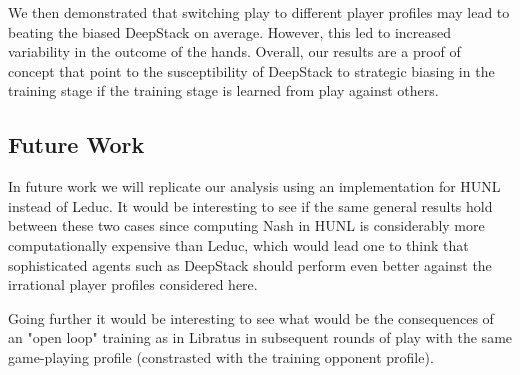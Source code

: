 \documentclass{article}
\begin{document}
\indent We then demonstrated that switching play to different player profiles may lead to beating the biased DeepStack on average. However, this led to increased variability in the outcome of the hands. Overall, our results are a proof of concept that point to the susceptibility of DeepStack to strategic biasing in the training stage if the training stage is learned from play against others. 

\subsection{Future Work}
In future work we will replicate our analysis using an implementation for HUNL instead of Leduc. It would be interesting to see if the same general results hold between these two cases since computing Nash in HUNL is considerably more computationally expensive than Leduc, which would lead one to think that sophisticated agents such as DeepStack should perform even better against the irrational player profiles considered here. 

\indent Going further it would be interesting to see what would be the consequences of an "open loop" training as in Libratus in subsequent rounds of play with the same game-playing profile (constrasted with the training opponent profile). %



\end{document}
